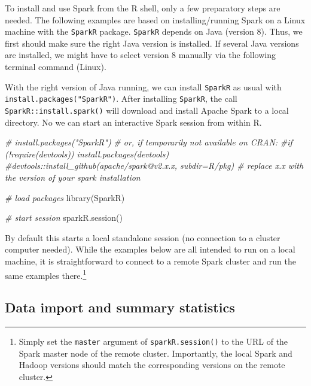 \documentclass[
  12pt,
]{style/krantz}
\newenvironment{Shaded}{\begin{snugshade}}{\end{snugshade}}
\newcommand{\CommentTok}[1]{\textcolor[rgb]{0.56,0.35,0.01}{\textit{#1}}}
\newcommand{\FunctionTok}[1]{\textcolor[rgb]{0.00,0.00,0.00}{#1}}
\newcommand{\NormalTok}[1]{#1}
\begin{document}
To install and use Spark from the R shell, only a few preparatory steps are needed. The following examples are based on installing/running Spark on a Linux machine with the \texttt{SparkR} package. \texttt{SparkR} depends on Java (version 8). Thus, we first should make sure the right Java version is installed. If several Java versions are installed, we might have to select version 8 manually via the following terminal command (Linux).

With the right version of Java running, we can install \texttt{SparkR} as usual with \texttt{install.packages("SparkR")}. After installing \texttt{SparkR}, the call \texttt{SparkR::install.spark()} will download and install Apache Spark to a local directory. No we can start an interactive Spark session from within R.

\begin{Shaded}
\begin{Highlighting}[]
\CommentTok{\# install.packages("SparkR")}
\CommentTok{\# or, if temporarily not available on CRAN:}
\CommentTok{\#if (!require(\textquotesingle{}devtools\textquotesingle{})) install.packages(\textquotesingle{}devtools\textquotesingle{})}
\CommentTok{\#devtools::install\_github(\textquotesingle{}apache/spark@v2.x.x\textquotesingle{}, subdir=\textquotesingle{}R/pkg\textquotesingle{}) \# replace x.x with the version of your spark installation}

\CommentTok{\# load packages}
\FunctionTok{library}\NormalTok{(SparkR)}

\CommentTok{\# start session}
\FunctionTok{sparkR.session}\NormalTok{()}
\end{Highlighting}
\end{Shaded}

By default this starts a local standalone session (no connection to a cluster computer needed). While the examples below are all intended to run on a local machine, it is straightforward to connect to a remote Spark cluster and run the same examples there.\footnote{Simply set the \texttt{master} argument of \texttt{sparkR.session()} to the URL of the Spark master node of the remote cluster. Importantly, the local Spark and Hadoop versions should match the corresponding versions on the remote cluster.}

\hypertarget{data-import-and-summary-statistics}{%
\subsection{Data import and summary statistics}\label{data-import-and-summary-statistics}}
\end{document}
